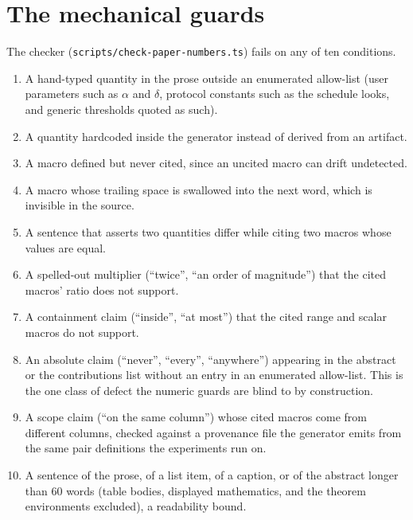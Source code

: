 \venueappendix

\keepheading
\section{The mechanical guards}
\label{app:guards}
The checker (\texttt{scripts/check-paper-numbers.ts}) fails on any of
ten conditions.
\begin{enumerate}
\item A hand-typed quantity in the prose outside an enumerated
allow-list (user parameters such as $\alpha$ and $\delta$, protocol
constants such as the schedule looks, and generic thresholds quoted as
such).
\item A quantity hardcoded inside the generator instead of derived from
an artifact.
\item A macro defined but never cited, since an uncited macro can drift
undetected.
\item A macro whose trailing space is swallowed into the next word,
which is invisible in the source.
\item A sentence that asserts two quantities differ while citing two
macros whose values are equal.
\item A spelled-out multiplier (``twice'', ``an order of magnitude'')
that the cited macros' ratio does not support.
\item A containment claim (``inside'', ``at most'') that the cited
range and scalar macros do not support.
\item An absolute claim (``never'', ``every'', ``anywhere'') appearing
in the abstract or the contributions list without an entry in an
enumerated allow-list. This is the one class of defect the numeric
guards are blind to by construction.
\item A scope claim (``on the same column'') whose cited macros come
from different columns, checked against a provenance file the generator
emits from the same pair definitions the experiments run on.
\item A sentence of the prose, of a list item, of a caption, or of the
abstract longer than 60 words (table bodies, displayed mathematics, and
the theorem environments excluded), a readability bound.
\end{enumerate}
